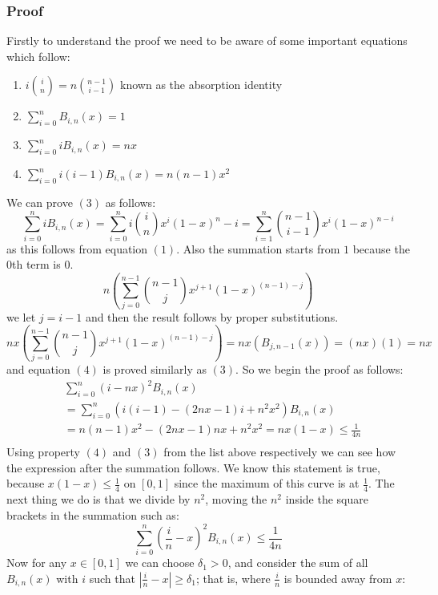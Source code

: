 \documentclass{article}
\begin{document}
\subsubsection{Proof}
Firstly to understand the proof we need to be aware of some important equations which follow:
\begin{enumerate}
\item $i\binom{i}{n}=n\binom{n-1}{i-1}$ known as the absorption identity
\item $\sum_{i=0}^nB_{i,n}(x)=1$
\item $\sum_{i=0}^niB_{i,n}(x)=nx$
\item $\sum_{i=0}^ni(i-1)B_{i,n}(x)=n(n-1)x^2$
\end{enumerate}
We can prove $(3)$ as follows:
\begin{equation}
\sum_{i=0}^niB_{i,n}(x)=\sum_{i=0}^ni\binom{i}{n}x^i(1-x)^n-i=\sum_{i=1}^n\binom{n-1}{i-1}x^i(1-x)^{n-i}    
\end{equation}
as this follows from equation $(1)$. Also the summation starts from $1$ because the $0$th term is $0$.
\begin{equation}
n\left(\sum_{j=0}^{n-1}\binom{n-1}{j}x^{j+1}(1-x)^{(n-1)-j}\right)    
\end{equation}
we let $j=i-1$ and then the result follows by proper substitutions.
\begin{equation}
nx\left(\sum_{j=0}^{n-1}\binom{n-1}{j}x^{j+1}(1-x)^{(n-1)-j}\right)=nx\left(B_{j,n-1}(x)\right)=(nx)(1)=nx    
\end{equation}
and equation $(4)$ is proved similarly as $(3)$. So we begin the proof as follows:
\begin{align*}
&\sum_{i=0}^n(i-nx)^2B_{i,n}(x)\\
&=\sum_{i=0}^n(i(i-1)-(2nx-1)i+n^2 x^2)B_{i,n}(x)\\
&=n(n-1)x^2-(2nx-1)nx+n^2 x^2=nx(1-x)\leq\frac{1}{4n}\\   
\end{align*}
Using property $(4)$ and $(3)$ from the list above respectively we can see how the expression after the summation follows.
We know this statement is true, because $x(1-x)\leq\frac{1}{4}$ on $[0,1]$ since the maximum of this curve is at $\frac{1}{4}$. The next thing we do is that we divide by $n^2$, moving the $n^2$ inside the square brackets in the summation such as:
\begin{equation}
\sum_{i=0}^n\left(\frac{i}{n}-x\right)^2B_{i,n}(x)\leq\frac{1}{4n}    
\end{equation}
Now for any $x\in[0,1]$ we can choose $\delta_1>0$, and consider the sum of all $B_{i,n}(x)$ with $i$ such that $|\frac{i}{n}-x|\geq\delta_1$; that is, where $\frac{i}{n}$ is bounded away from $x$:
\end{document}
